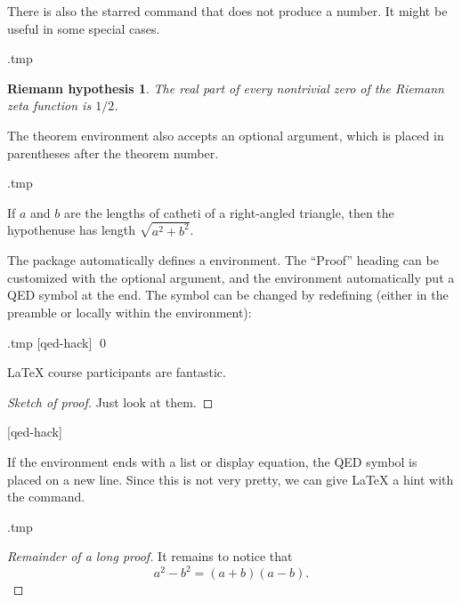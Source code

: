 There is also the starred  command that does not produce a number.
It might be useful in some special cases.
%
\begin{VerbatimOut}{\jobname.tmp}
\theoremstyle{plain}
\newtheorem*{riemannhyp}{Riemann hypothesis}

\begin{riemannhyp}
The real part of every nontrivial zero of the Riemann zeta function is $1/2$.
\end{riemannhyp}
\end{VerbatimOut}
\ShowExampleBelow


The theorem environment also accepts an optional argument,
which is placed in parentheses after the theorem number.
%
\begin{VerbatimOut}{\jobname.tmp}
\begin{theorem}[Pythagoras]
If $a$ and $b$ are the lengths of catheti of a right-angled triangle,
then the hypothenuse has length $\sqrt{a^2 + b^2}$.
\end{theorem}
\end{VerbatimOut}
\ShowExampleBelow


The  package automatically defines a  environment.
The ``Proof'' heading can be customized with the optional argument,
and the environment automatically put a QED symbol at the end.
The symbol can be changed by redefining 
(either in the preamble or locally within the environment):
%
\begin{VerbatimOut}{\jobname.tmp}
\DeclareCommandCopy{\oldqedsymbol}{\qedsymbol}
[qed-hack]{%
\renewcommand{\qedsymbol}{\oldqedsymbol}\qedsymbol{$\heartsuit$}\qed}

\begin{theorem}
\LaTeX{} course participants are fantastic.
\end{theorem}
\begin{proof}[Sketch of proof]
Just look at them.
\renewcommand{\qedsymbol}{$\heartsuit$}
\end{proof}
\end{VerbatimOut}
\ShowExampleBelow[9]
[qed-hack]

If the environment ends with a list or display equation,
the QED symbol is placed on a new line.
Since this is not very pretty, we can give \LaTeX{} a hint with the  command.
%
\begin{VerbatimOut}{\jobname.tmp}
\newcommand{\qedhere}{}

\begin{proof}[Remainder of a long proof]
It remains to notice that
\[
a^2 - b^2 = (a+b)(a-b).
\qedhere
\]
\end{proof}
\end{VerbatimOut}
\ShowExampleBelow[3]


